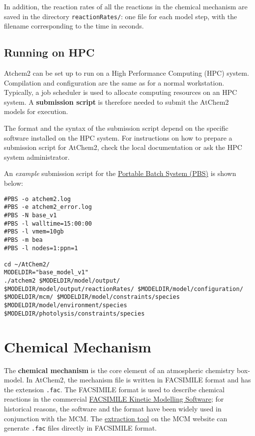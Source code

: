 In addition, the reaction rates of all the reactions in the chemical
mechanism are saved in the directory \texttt{reactionRates/}: one file
for each model step, with the filename corresponding to the time in
seconds.

\subsection{Running on HPC} \label{running-on-hpc}

Atchem2 can be set up to run on a High Performance Computing (HPC)
system. Compilation and configuration are the same as for a normal
workstation. Typically, a job scheduler is used to allocate computing
resources on an HPC system. A \textbf{submission script} is therefore
needed to submit the AtChem2 models for execution.

The format and the syntax of the submission script depend on the
specific software installed on the HPC system. For instructions on how
to prepare a submission script for AtChem2, check the local
documentation or ask the HPC system administrator.

An \emph{example} submission script for the
\href{https://en.wikipedia.org/wiki/Portable_Batch_System}{Portable
Batch System (PBS)} is shown below:

\begin{verbatim}
#PBS -o atchem2.log
#PBS -e atchem2_error.log
#PBS -N base_v1
#PBS -l walltime=15:00:00
#PBS -l vmem=10gb
#PBS -m bea
#PBS -l nodes=1:ppn=1

cd ~/AtChem2/
MODELDIR="base_model_v1"
./atchem2 $MODELDIR/model/output/ $MODELDIR/model/output/reactionRates/ $MODELDIR/model/configuration/ $MODELDIR/mcm/ $MODELDIR/model/constraints/species $MODELDIR/model/environment/species $MODELDIR/photolysis/constraints/species
\end{verbatim}

\section{Chemical Mechanism} \label{sec:mechanism}

The \textbf{chemical mechanism} is the core element of an atmospheric
chemistry box-model. In AtChem2, the mechanism file is written in
FACSIMILE format and has the extension \texttt{.fac}. The FACSIMILE
format is used to describe chemical reactions in the commercial
\href{http://www.mcpa-software.com/}{FACSIMILE Kinetic Modelling
Software}; for historical reasons, the software and the format have been
widely used in conjunction with the MCM. The
\href{http://mcm.leeds.ac.uk/MCMv3.3.1/extract.htt}{extraction tool} on
the MCM website can generate \texttt{.fac} files directly in FACSIMILE
format.

